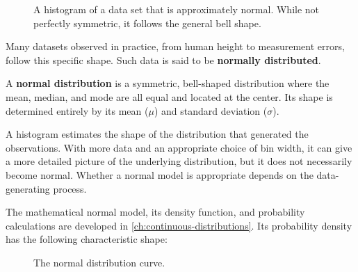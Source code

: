 \begin{figure}[htbp]
    \centering
    \caption{A histogram of a data set that is approximately normal. While not perfectly symmetric, it follows the general bell shape.}
    \label{fig:approx_normal_hist}
\end{figure}

Many datasets observed in practice, from human height to measurement errors, follow this specific shape. Such data is said to be \textbf{normally distributed}.

\begin{definition}
A \textbf{normal distribution} is a symmetric, bell-shaped distribution where the mean, median, and mode are all equal and located at the center. Its shape is determined entirely by its mean ($\mu$) and standard deviation ($\sigma$).
\end{definition}

A histogram estimates the shape of the distribution that generated the observations. With more data and an appropriate choice of bin width, it can give a more detailed picture of the underlying distribution, but it does not necessarily become normal. Whether a normal model is appropriate depends on the data-generating process.

The mathematical normal model, its density function, and probability calculations are developed in \autoref{ch:continuous-distributions}. Its probability density has the following characteristic shape:

\begin{figure}[htbp]
    \centering
    \caption{The normal distribution curve.}
    \label{fig:normal_curve_smooth}
\end{figure}


